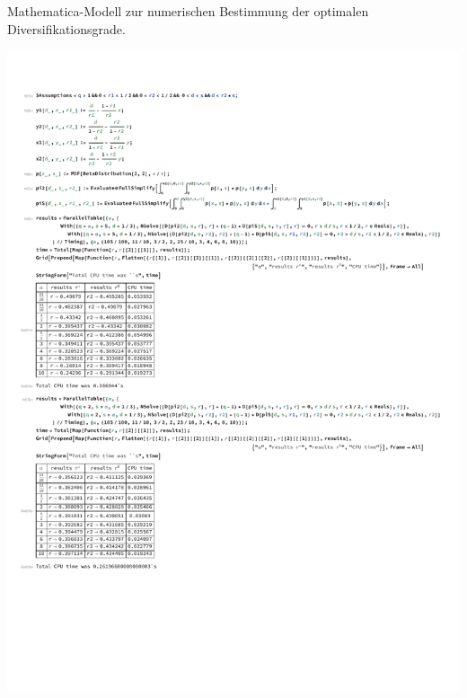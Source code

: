 \begin{table}
	\centering
	\caption{Mathematica-Modell zur numerischen Bestimmung der optimalen Diversifikationsgrade.}%
	\label{tbl:mathematica}
	\includegraphics[scale=0.7]{figures/mathematica-source}
\end{table}